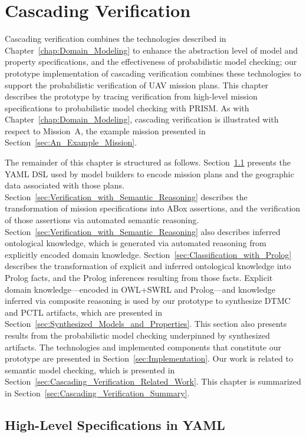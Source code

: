 \chapter{Cascading Verification}
\label{chap:Cascading_Verification}

Cascading verification combines the technologies described in Chapter~\ref{chap:Domain_Modeling} to enhance the abstraction level of model and property specifications, and the effectiveness of probabilistic model checking; our prototype implementation of cascading verification combines these technologies to support the probabilistic verification of UAV mission plans. This chapter describes the prototype by tracing verification from high-level mission specifications to probabilistic model checking with PRISM\@. As with Chapter~\ref{chap:Domain_Modeling}, cascading verification is illustrated with respect to Mission~A, the example mission presented in Section~\ref{sec:An_Example_Mission}.

The remainder of this chapter is structured as follows. Section~\ref{sec:High_Level_Specifications_in_YAML} presents the YAML DSL used by model builders to encode mission plans and the geographic data associated with those plans. Section~\ref{sec:Verification_with_Semantic_Reasoning} describes the transformation of mission specifications into ABox assertions, and the verification of those assertions via automated semantic reasoning. Section~\ref{sec:Verification_with_Semantic_Reasoning} also describes inferred ontological knowledge, which is generated via automated reasoning from explicitly encoded domain knowledge. Section~\ref{sec:Classification_with_Prolog} describes the transformation of explicit and inferred ontological knowledge into Prolog facts, and the Prolog inferences resulting from those facts. Explicit domain knowledge---encoded in OWL+SWRL and Prolog---and knowledge inferred via composite reasoning is used by our prototype to synthesize DTMC and PCTL artifacts, which are presented in Section~\ref{sec:Synthesized_Models_and_Properties}. This section also presents results from the probabilistic model checking underpinned by synthesized artifacts. The technologies and implemented components that constitute our prototype are presented in Section~\ref{sec:Implementation}. Our work is related to semantic model checking, which is presented in Section~\ref{sec:Cascading_Verification_Related_Work}. This chapter is summarized in Section~\ref{sec:Cascading_Verification_Summary}.

\section{High-Level Specifications in YAML}
\label{sec:High_Level_Specifications_in_YAML}

